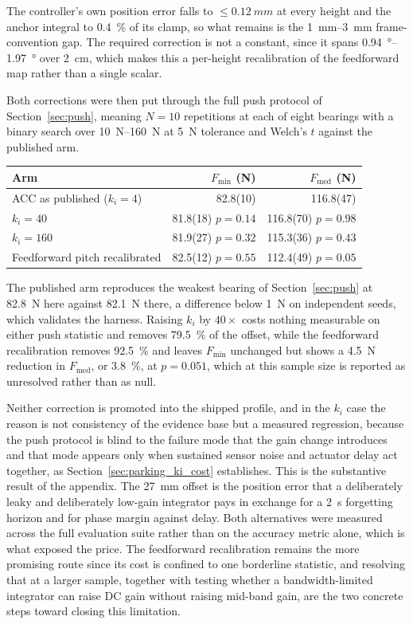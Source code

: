 \documentclass[a4paper,fleqn]{cas-dc}
\begin{document}
The controller's own position error falls to ${\leq}\SI{0.12}{mm}$ at every
height and the anchor integral to \SI{0.4}{\percent} of its clamp, so what
remains is the \SIrange{1}{3}{mm} frame-convention gap. The required correction
is not a constant, since it spans \SIrange{0.94}{1.97}{\degree} over
\SI{2}{cm}, which makes this a per-height recalibration of the feedforward map
rather than a single scalar.

Both corrections were then put through the full push protocol of
Section~\ref{sec:push}, meaning $N{=}10$ repetitions at each of eight bearings
with a binary search over \SIrange{10}{160}{N} at \SI{5}{N} tolerance and
Welch's $t$ against the published arm.

\begin{center}\footnotesize\setlength{\tabcolsep}{4pt}
\begin{tabular}{lrr}
\hline
Arm & $F_{\min}$ (N) & $F_{\text{med}}$ (N) \\
\hline
ACC as published ($k_i{=}4$) & 82.8(10) & 116.8(47) \\
$k_i{=}40$ & 81.8(18)\,\,$p{=}0.14$ & 116.8(70)\,\,$p{=}0.98$ \\
$k_i{=}160$ & 81.9(27)\,\,$p{=}0.32$ & 115.3(36)\,\,$p{=}0.43$ \\
Feedforward pitch recalibrated & 82.5(12)\,\,$p{=}0.55$ & 112.4(49)\,\,$p{=}0.05$ \\
\hline
\end{tabular}
\end{center}

The published arm reproduces the weakest bearing of Section~\ref{sec:push} at
\SI{82.8}{N} here against \SI{82.1}{N} there, a difference below \SI{1}{N} on
independent seeds, which validates the harness. Raising $k_i$ by $40{\times}$
costs nothing measurable on either push statistic and removes
\SI{79.5}{\percent} of the offset, while the feedforward recalibration removes
\SI{92.5}{\percent} and leaves $F_{\min}$ unchanged but shows a \SI{4.5}{N}
reduction in $F_{\text{med}}$, or \SI{3.8}{\percent}, at $p{=}0.051$, which at
this sample size is reported as unresolved rather than as null.

Neither correction is promoted into the shipped profile, and in the $k_i$ case
the reason is not consistency of the evidence base but a measured regression,
because the push protocol is blind to the failure mode that the gain change
introduces and that mode appears only when sustained sensor noise and actuator
delay act together, as Section~\ref{sec:parking_ki_cost} establishes. This is
the substantive result of the appendix. The \SI{27}{mm} offset is the position
error that a deliberately leaky and deliberately low-gain integrator pays in
exchange for a \SI{2}{s} forgetting horizon and for phase margin against delay.
Both alternatives were measured across the full evaluation suite rather than on
the accuracy metric alone, which is what exposed the price. The feedforward
recalibration remains the more promising route since its cost is confined to one
borderline statistic, and resolving that at a larger sample, together with
testing whether a bandwidth-limited integrator can raise DC gain without raising
mid-band gain, are the two concrete steps toward closing this limitation.
\end{document}
